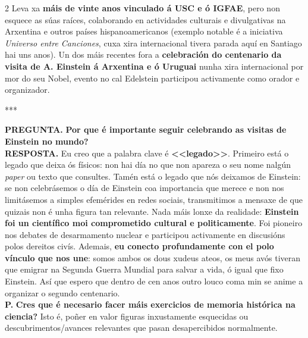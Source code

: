 \begin{refsection}
\begin{multicols}{2}
Leva xa \textbf{máis de vinte anos vinculado á USC e ó IGFAE}, pero non esquece as súas raíces, colaborando en actividades culturais e divulgativas na Arxentina e outros países hispanoamericanos (exemplo notable é a iniciativa \emph{Universo entre Canciones}, cuxa xira internacional tivera parada aquí en Santiago hai uns anos). Un dos máis recentes fora a \textbf{celebración do centenario da visita de A. Einstein á Arxentina e ó Uruguai} nunha xira internacional por mor do seu Nobel, evento no cal Edelstein participou activamente como orador e organizador.

\begin{center}
    ***
\end{center}

\noindent \textbf{PREGUNTA.} \hspace{5px} \textbf{Por que é importante seguir celebrando as visitas de Einstein no mundo?}\\

\noindent \textbf{RESPOSTA.} \hspace{5px} Eu creo que a palabra clave é \textbf{<<legado>>}. Primeiro está o legado que deixa ós físicos: non hai día no que non apareza o seu nome nalgún \emph{paper} ou texto que consultes. Tamén está o legado que nós deixamos de Einstein: se non celebrásemos o día de Einstein coa importancia que merece e non nos limitásemos a simples efemérides en redes sociais, transmitimos a mensaxe de que quizais non é unha figura tan relevante. Nada máis lonxe da realidade: \textbf{Einstein foi un científico moi comprometido cultural e politicamente}. Foi pioneiro nos debates de desarmamento nuclear e participou activamente en discusións polos dereitos civís. Ademais, \textbf{eu conecto profundamente con el polo vínculo que nos une}: somos ambos os dous xudeus ateos, os meus avós tiveran que emigrar na Segunda Guerra Mundial para salvar a vida, ó igual que fixo Einstein. Así que espero que dentro de cen anos outro louco coma min se anime a organizar o segundo centenario.\\

\noindent \textbf{P.} \hspace{5px} \textbf{Cres que é necesario facer máis exercicios de memoria histórica na ciencia?} Isto é, poñer en valor figuras inxustamente esquecidas ou descubrimentos/avances relevantes que pasan desapercibidos normalmente.\\


\end{multicols}
\end{refsection}
